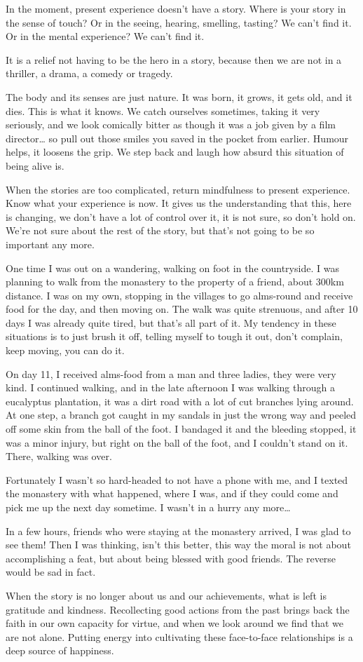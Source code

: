 In the moment, present experience doesn't have a story. Where is your
story in the sense of touch? Or in the seeing, hearing, smelling,
tasting? We can't find it. Or in the mental experience? We can't find
it.

It is a relief not having to be the hero in a story, because then we are
not in a thriller, a drama, a comedy or tragedy.

The body and its senses are just nature. It was born, it grows, it gets
old, and it dies. This is what it knows. We catch ourselves sometimes,
taking it very seriously, and we look comically bitter as though it was
a job given by a film director\ldots{} so pull out those smiles you
saved in the pocket from earlier. Humour helps, it loosens the grip. We
step back and laugh how absurd this situation of being alive is.

When the stories are too complicated, return mindfulness to present
experience. Know what your experience is now. It gives us the
understanding that this, here is changing, we don't have a lot of
control over it, it is not sure, so don't hold on. We're not sure about
the rest of the story, but that's not going to be so important any more.

One time I was out on a wandering, walking on foot in the countryside. I
was planning to walk from the monastery to the property of a friend,
about 300km distance. I was on my own, stopping in the villages to go
alms-round and receive food for the day, and then moving on. The walk
was quite strenuous, and after 10 days I was already quite tired, but
that's all part of it. My tendency in these situations is to just brush
it off, telling myself to tough it out, don't complain, keep moving, you
can do it.

On day 11, I received alms-food from a man and three ladies, they were
very kind. I continued walking, and in the late afternoon I was walking
through a eucalyptus plantation, it was a dirt road with a lot of cut
branches lying around. At one step, a branch got caught in my sandals in
just the wrong way and peeled off some skin from the ball of the foot. I
bandaged it and the bleeding stopped, it was a minor injury, but right
on the ball of the foot, and I couldn't stand on it. There, walking was
over.

Fortunately I wasn't so hard-headed to not have a phone with me, and I
texted the monastery with what happened, where I was, and if they could
come and pick me up the next day sometime. I wasn't in a hurry any
more\ldots{}

In a few hours, friends who were staying at the monastery arrived, I was
glad to see them! Then I was thinking, isn't this better, this way the
moral is not about accomplishing a feat, but about being blessed with
good friends. The reverse would be sad in fact.

When the story is no longer about us and our achievements, what is left
is gratitude and kindness. Recollecting good actions from the past
brings back the faith in our own capacity for virtue, and when we look
around we find that we are not alone. Putting energy into cultivating
these face-to-face relationships is a deep source of happiness.
